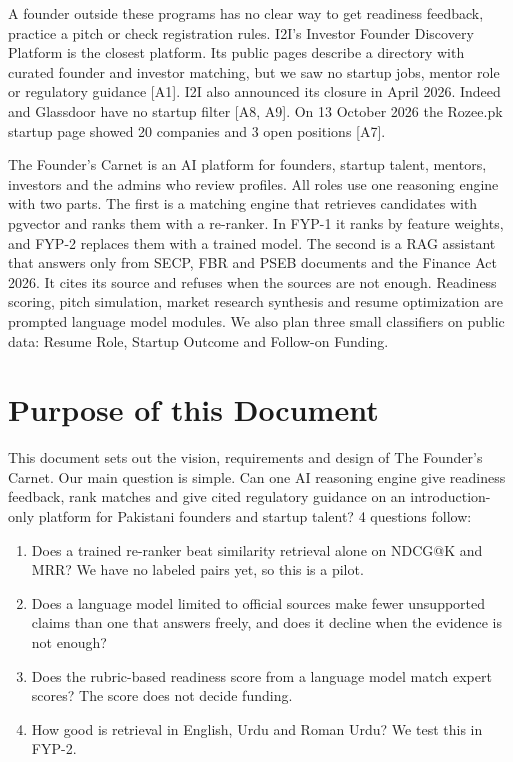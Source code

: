 \documentclass{FastFyp}
\newcommand{\src}[1]{[#1]}
\begin{document}
A founder outside these programs has no clear way to get readiness feedback, practice a pitch or check registration rules. I2I's Investor Founder Discovery Platform is the closest platform. Its public pages describe a directory with curated founder and investor matching, but we saw no startup jobs, mentor role or regulatory guidance \src{A1}. I2I also announced its closure in April 2026. Indeed and Glassdoor have no startup filter \src{A8, A9}. On 13 October 2026 the Rozee.pk startup page showed 20 companies and 3 open positions \src{A7}.

The Founder's Carnet is an AI platform for founders, startup talent, mentors, investors and the admins who review profiles. All roles use one reasoning engine with two parts. The first is a matching engine that retrieves candidates with pgvector and ranks them with a re-ranker. In FYP-1 it ranks by feature weights, and FYP-2 replaces them with a trained model. The second is a RAG assistant that answers only from SECP, FBR and PSEB documents and the Finance Act 2026. It cites its source and refuses when the sources are not enough. Readiness scoring, pitch simulation, market research synthesis and resume optimization are prompted language model modules. We also plan three small classifiers on public data: Resume Role, Startup Outcome and Follow-on Funding.

\section{Purpose of this Document}
This document sets out the vision, requirements and design of The Founder's Carnet. Our main question is simple. Can one AI reasoning engine give readiness feedback, rank matches and give cited regulatory guidance on an introduction-only platform for Pakistani founders and startup talent? 4 questions follow:
\begin{enumerate}
    \item Does a trained re-ranker beat similarity retrieval alone on NDCG@K and MRR? We have no labeled pairs yet, so this is a pilot.
    \item Does a language model limited to official sources make fewer unsupported claims than one that answers freely, and does it decline when the evidence is not enough?
    \item Does the rubric-based readiness score from a language model match expert scores? The score does not decide funding.
    \item How good is retrieval in English, Urdu and Roman Urdu? We test this in FYP-2.
\end{enumerate}
\end{document}
